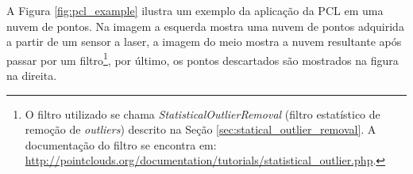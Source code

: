 A Figura \ref{fig:pcl_example} ilustra um exemplo da aplicação da PCL em uma nuvem de pontos. Na imagem a esquerda mostra uma nuvem de pontos adquirida a partir de um sensor a laser, a imagem do meio mostra a nuvem resultante após passar por um filtro\footnote{O filtro utilizado se chama \textit{StatisticalOutlierRemoval} (filtro estatístico de remoção de \textit{outliers}) descrito na Seção \ref{sec:statical_outlier_removal}. A documentação do filtro se encontra em: \url{http://pointclouds.org/documentation/tutorials/statistical_outlier.php}.}, por último, os pontos descartados são mostrados na figura na direita.